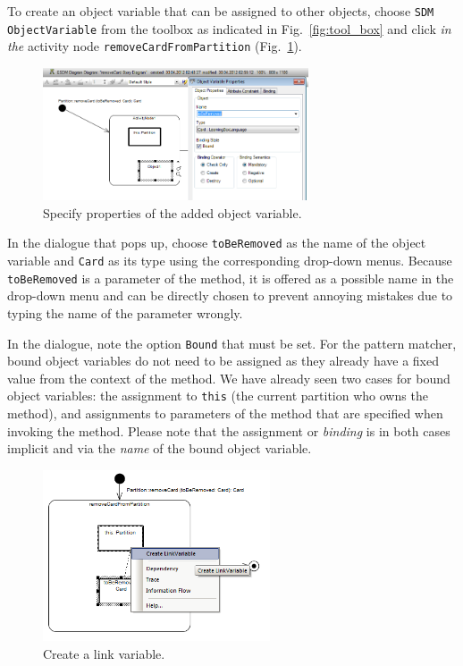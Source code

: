 To create an object variable that can be assigned to other objects, choose
\texttt{SDM ObjectVariable} from the toolbox as indicated in
Fig.~\ref{fig:tool_box} and click \emph{in the} activity node \texttt{removeCardFromPartition} (Fig.~\ref{fig:object_variable_properties}). 


\begin{figure}[htp]
\begin{center}
  \includegraphics[width=0.7\textwidth]{pics/sdmBilder/removeCard/sdm10RAW}
  \caption{Specify properties of the added object variable.}  
  \label{fig:object_variable_properties}
\end{center}
\end{figure}

In the dialogue that pops up, choose \texttt{toBeRemoved} as the name of the
object variable and \texttt{Card} as its type using the corresponding drop-down
menus. 
Because \texttt{toBeRemoved} is a parameter of the method, it
is offered as a possible name in the drop-down menu and can be directly chosen to prevent
annoying mistakes due to typing the name of the parameter wrongly.

In the dialogue, note the option \texttt{Bound} that must be set.
For the pattern matcher, bound object variables do not need to be assigned as
they already have a fixed value from the context of the method.  We have already
seen two cases  for bound object variables: the assignment to \texttt{this} (the
current  partition who owns the method), and assignments to parameters of the
method that  are specified when invoking the method.  Please note that the
assignment or \emph{binding} is in both cases implicit and via the \emph{name}
of the bound object variable. 

\begin{figure}[htp]
\begin{center}
  \includegraphics[width=0.6\textwidth]{pics/sdmBilder/removeCard/sdm11RAW}
  \caption{Create a link variable.}   
  \label{fig:link_variable}
\end{center}
\end{figure}

